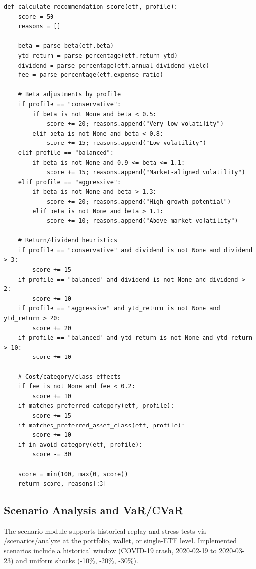 \begin{lstlisting}[style=pythonstyle, caption={Rule-Based Recommendation Scoring (Simplified), basicstyle=\ttfamily\footnotesize}]
def calculate_recommendation_score(etf, profile):
    score = 50
    reasons = []

    beta = parse_beta(etf.beta)
    ytd_return = parse_percentage(etf.return_ytd)
    dividend = parse_percentage(etf.annual_dividend_yield)
    fee = parse_percentage(etf.expense_ratio)

    # Beta adjustments by profile
    if profile == "conservative":
        if beta is not None and beta < 0.5:
            score += 20; reasons.append("Very low volatility")
        elif beta is not None and beta < 0.8:
            score += 15; reasons.append("Low volatility")
    elif profile == "balanced":
        if beta is not None and 0.9 <= beta <= 1.1:
            score += 15; reasons.append("Market-aligned volatility")
    elif profile == "aggressive":
        if beta is not None and beta > 1.3:
            score += 20; reasons.append("High growth potential")
        elif beta is not None and beta > 1.1:
            score += 10; reasons.append("Above-market volatility")

    # Return/dividend heuristics
    if profile == "conservative" and dividend is not None and dividend > 3:
        score += 15
    if profile == "balanced" and dividend is not None and dividend > 2:
        score += 10
    if profile == "aggressive" and ytd_return is not None and ytd_return > 20:
        score += 20
    if profile == "balanced" and ytd_return is not None and ytd_return > 10:
        score += 10

    # Cost/category/class effects
    if fee is not None and fee < 0.2:
        score += 10
    if matches_preferred_category(etf, profile):
        score += 15
    if matches_preferred_asset_class(etf, profile):
        score += 10
    if in_avoid_category(etf, profile):
        score -= 30

    score = min(100, max(0, score))
    return score, reasons[:3]
\end{lstlisting}

\subsection{Scenario Analysis and VaR/CVaR}

The scenario module supports historical replay and stress tests via /scenarios/analyze at the portfolio, wallet, or single-ETF level. Implemented scenarios include a historical window (COVID-19 crash, 2020-02-19 to 2020-03-23) and uniform shocks (-10\%, -20\%, -30\%).

